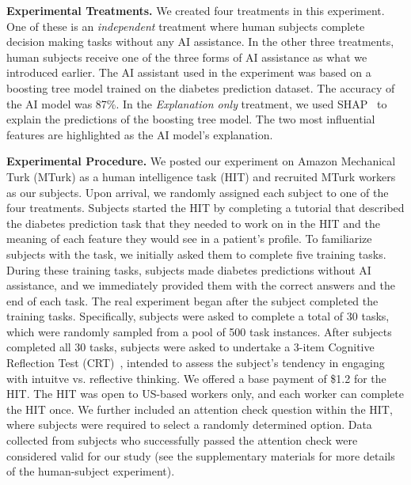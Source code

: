 \documentclass[letterpaper]{article} %
\begin{document}
\vspace{2pt}
\noindent \textbf{Experimental Treatments.} We created four treatments in this experiment. One of these is an \emph{independent} treatment where human subjects complete decision making tasks without any AI assistance.  In the other three treatments, human subjects receive one of the three forms of AI assistance as what we introduced earlier. The AI assistant used in the experiment was based on a boosting tree model trained on the diabetes prediction dataset. The accuracy of the AI model was 87\%.  In the \emph{Explanation only} treatment,  we used SHAP~\cite{lundberg2017unified} to explain the predictions of the boosting tree model. The two most influential features are highlighted as the AI model's explanation.

\vspace{2pt}
\noindent\textbf{Experimental Procedure.} We posted our experiment on Amazon Mechanical Turk (MTurk) as a human intelligence task (HIT) and recruited MTurk workers as our subjects. Upon arrival, we randomly assigned each subject to one of the four treatments. 
Subjects started the HIT by completing a tutorial that described the diabetes prediction task that they needed to work on in the HIT and the meaning of each feature they would see in a patient’s profile. To familiarize subjects with the task, we initially asked them to complete five training tasks. During these training tasks, subjects made diabetes predictions without AI assistance, and we immediately provided them with the correct answers and the end of each task.
The real experiment began after the subject completed the training tasks. Specifically,  subjects were asked to complete a total of 30 tasks, which were randomly sampled from a pool of 500 task instances. After subjects completed all 30 tasks, subjects were asked to undertake a 3-item Cognitive Reflection Test (CRT)~\cite{Frederick2005CognitiveRA}, intended to assess the subject's tendency in engaging with intuitve vs. reflective thinking. 
We offered a base payment of \$1.2 for the HIT. The HIT was open to US-based workers only, and each worker can complete the HIT once. We further included an attention check question within the HIT, where subjects were required to select a randomly determined option. Data collected from subjects who successfully passed the attention check were considered valid for our study (see the supplementary materials for more details of the human-subject experiment).
\end{document}

